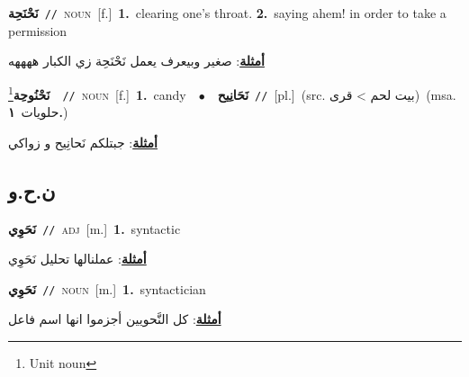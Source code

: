\documentclass[10pt,a4paper,twoside]{article} %
\begin{document}
\begin{multicols}{2}
{\setlength\topsep{0pt}\textbf{\foreignlanguage{arabic}{نَحْنَحِة}}\ {\color{gray}\texttt{//}\color{black}}\ \textsc{noun}\ [f.]\ \textbf{1.}~clearing one's throat.  \textbf{2.}~saying ahem! in order to take a permission\  \begin{flushright}\color{gray}\foreignlanguage{arabic}{\textbf{\underline{\foreignlanguage{arabic}{أمثلة}}}: صغير وبيعرف يعمل نَحْنَحِة زي الكبار ههههه}\end{flushright}\color{black}} \vspace{2mm}

{\setlength\topsep{0pt}\textbf{\foreignlanguage{arabic}{نَحْنُوحِة}}\footnote{Unit noun}\ \ {\color{gray}\texttt{//}\color{black}}\ \textsc{noun}\ [f.]\ \textbf{1.}~candy\ \ $\bullet$\ \ \setlength\topsep{0pt}\textbf{\foreignlanguage{arabic}{نَحَانِيح}}\ {\color{gray}\texttt{//}\color{black}}\ [pl.]\ (src. \color{gray}\foreignlanguage{arabic}{بيت لحم > قرى}\color{black})\ \color{gray}(msa. \foreignlanguage{arabic}{حلويات}~\foreignlanguage{arabic}{\textbf{١.}})\color{black}\  \begin{flushright}\color{gray}\foreignlanguage{arabic}{\textbf{\underline{\foreignlanguage{arabic}{أمثلة}}}: جبتلكم نَحانِيح و زواكي}\end{flushright}\color{black}} \vspace{2mm}

\vspace{-3mm}
\subsection*{\color{blue}\foreignlanguage{arabic}{ن.ح.و}\color{blue}{}} 

{\setlength\topsep{0pt}\textbf{\foreignlanguage{arabic}{نَحَوِي}}\ {\color{gray}\texttt{//}\color{black}}\ \textsc{adj}\ [m.]\ \textbf{1.}~syntactic\  \begin{flushright}\color{gray}\foreignlanguage{arabic}{\textbf{\underline{\foreignlanguage{arabic}{أمثلة}}}: عملنالها تحليل نَحَوِي}\end{flushright}\color{black}} \vspace{2mm}

{\setlength\topsep{0pt}\textbf{\foreignlanguage{arabic}{نَحَوِي}}\ {\color{gray}\texttt{//}\color{black}}\ \textsc{noun}\ [m.]\ \textbf{1.}~syntactician\  \begin{flushright}\color{gray}\foreignlanguage{arabic}{\textbf{\underline{\foreignlanguage{arabic}{أمثلة}}}: كل النَّحويين أجزموا انها اسم فاعل}\end{flushright}\color{black}} \vspace{2mm}


\end{multicols}
\end{document}
